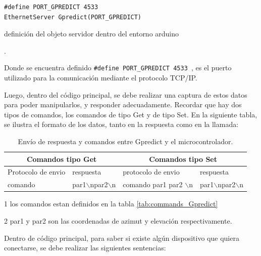 \begin{listing}[ht!]
	\begin{verbatim}
#define PORT_GPREDICT 4533 
EthernetServer Gpredict(PORT_GPREDICT)
	\end{verbatim}

\caption{definición del objeto servidor dentro del entorno arduino}. 
\label{cod:obj_serv_gpr}
\end{listing}
Donde se encuentra definido \texttt{#define PORT_GPREDICT 4533 }, es el puerto utilizado para la comunicación mediante el protocolo TCP/IP.

Luego, dentro del código principal, se debe realizar una captura de estos datos para poder manipularlos, y responder adecuadamente. Recordar que hay dos tipos de comandos, los comandos de tipo Get y de tipo Set. En la siguiente tabla, se ilustra el formato de los datos, tanto en la respuesta como en la llamada: 
\begin{table}[ht]
	\centering
 \begin{threeparttable}	
	\begin{tabular}{|p{2.0cm}|p{2.0cm}|p{2.0cm}|p{2.0cm}|} 
		\hline
		\multicolumn{2}{|c|}{Comandos tipo Get} &\multicolumn{2}{c|}{Comandos tipo Set}  
		\\ \hline 
		Protocolo de envio & respuesta & protocolo de envio & respuesta \\ \hline 
		comando\tnote{1} & par1$\backslash$npar2$\backslash$n & 
		comando\tnote{1} par1\tnote{2} par2\tnote{2}  $\backslash$n & par1$\backslash$npar2$\backslash$n  \\ 
		\hline 
	\end{tabular}
	\begin{tablenotes}
		\item [1] los comandos estan definidos en la tabla \ref{tab:commands_Gpredict}   
		\item [2] par1 y par2 son las coordenadas de azimut y elevación respectivamente.  
		
	\end{tablenotes}


\end{threeparttable}
	\caption{Envío de respuesta y comandos entre Gpredict y el microcontrolador.}
	\label{tab:protocol_tx_gpr}
\end{table}


Dentro de código principal, para saber si existe algún dispositivo que quiera conectarse, se debe realizar las siguientes sentencias: 


